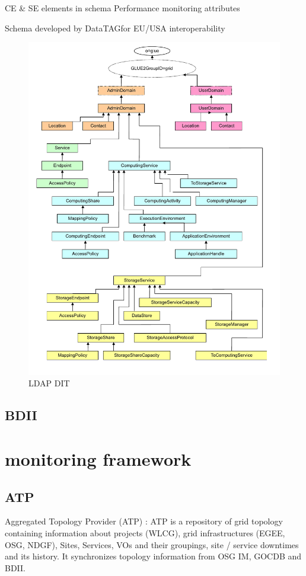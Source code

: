 CE \& SE elements in schema
Performance monitoring attributes

Schema developed by DataTAGfor EU/USA interoperability


\begin{figure}[htb]
\centering
 \includegraphics[width=6in]{images/glue2}
\caption{LDAP DIT}
\label{figure:gluedit}
\end{figure}

\subsection{BDII}




\section{monitoring framework}

\subsection{ATP}
Aggregated Topology Provider (ATP) : ATP is a repository of grid topology
containing information about projects (WLCG), grid infrastructures (EGEE, OSG,
NDGF), Sites, Services, VOs and their groupings, site / service downtimes and
its history. It synchronizes topology information from OSG IM, GOCDB and BDII.

